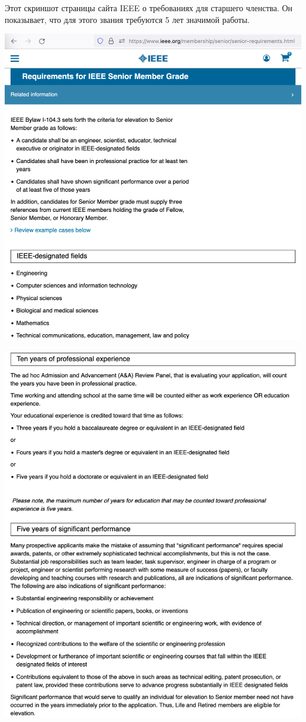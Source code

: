 
Этот скриншот страницы сайта IEEE о требованиях для старшего членства.
Он показывает, что для этого звания требуются 5 лет значимой работы.

\includegraphics[width=\textwidth]{senior-requirements-p1}
\WillContinue

\Continuing
\includegraphics[width=\textwidth]{senior-requirements-p2}

\pagebreak
